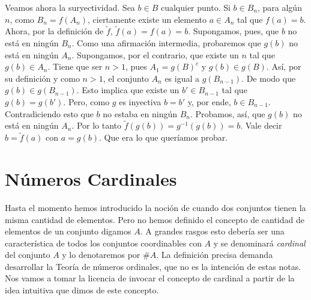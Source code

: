 \begin{demo}
Veamos ahora la suryectividad. Sea $b\in B$ cualquier punto. Si
$b\in B_n$, para algún $n$, como $B_n=f(A_n)$, ciertamente
existe un elemento $a\in A_n$ tal que $f(a)=b$. Ahora, por la
definición de $\tilde{f}$, $\tilde{f}(a)=f(a)=b$. Supongamos,
pues, que $b$ no está en ningún $B_n$. Como una afirmación
intermedia, probaremos que $g(b)$ no está en ningún $A_n$.
Supongamos, por el contrario, que existe un $n$ tal que $g(b)\in
A_n$. Tiene que ser $n>1$, pues $A_1=g(B)^c$ y $g(b)\in g(B)$.
Así, por su definición  y como $n>1$, el conjunto $A_n$ es
igual a $g(B_{n-1})$. De modo que $g(b)\in g(B_{n-1})$. Esto
implica que existe un $b'\in B_{n-1}$ tal que $g(b)=g(b')$. Pero,
como $g$ es inyectiva $b=b'$ y, por ende, $b\in B_{n-1}$.
Contradiciendo esto que $b$ no estaba en ningún $B_n$. Probamos,
así, que $g(b)$ no está en ningún $A_n$. Por lo tanto
$\tilde{f}(g(b))=g^{-1}(g(b))=b$. Vale decir $b=\tilde{f}(a)$ con
$a=g(b)$. Que era lo que queríamos probar.
\end{demo}

\section{Números Cardinales}

Hasta el momento hemos introducido la noción de cuando dos conjuntos tienen la misma cantidad de elementos. Pero no hemos definido el concepto de cantidad de elementos de un conjunto digamos $A$.  A grandes rasgos esto debería ser una característica de todos los conjuntos coordinables con $A$ y se denominará \emph{cardinal} del conjunto $A$ y lo denotaremos por $\#A$. La definición precisa demanda desarrollar la Teoría de números ordinales, que no es la intención de estas notas. Nos vamos a tomar la licencia de invocar el concepto de cardinal a partir de la idea intuitiva que dimos de este concepto. 

